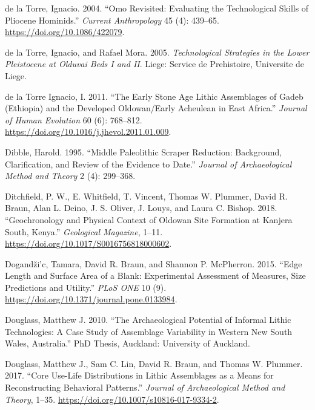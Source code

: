 \documentclass[]{elsarticle} %
\begin{document}
\leavevmode\hypertarget{ref-delatorreOmoRevisitedEvaluating2004}{}%
de la Torre, Ignacio. 2004. ``Omo Revisited: Evaluating the
Technological Skills of Pliocene Hominids.'' \emph{Current Anthropology}
45 (4): 439--65. \url{https://doi.org/10.1086/422079}.

\leavevmode\hypertarget{ref-delatorreTechnologicalStrategiesLower2005}{}%
de la Torre, Ignacio, and Rafael Mora. 2005. \emph{Technological
Strategies in the Lower Pleistocene at Olduvai Beds I and II}. Liege:
Service de Prehistoire, Universite de Liege.

\leavevmode\hypertarget{ref-delatorreignacioEarlyStoneAge2011}{}%
de la Torre Ignacio, I. 2011. ``The Early Stone Age Lithic Assemblages
of Gadeb (Ethiopia) and the Developed Oldowan/Early Acheulean in East
Africa.'' \emph{Journal of Human Evolution} 60 (6): 768--812.
\url{https://doi.org/10.1016/j.jhevol.2011.01.009}.

\leavevmode\hypertarget{ref-dibbleMiddlePaleolithicScraper1995}{}%
Dibble, Harold. 1995. ``Middle Paleolithic Scraper Reduction:
Background, Clarification, and Review of the Evidence to Date.''
\emph{Journal of Archaeological Method and Theory} 2 (4): 299--368.

\leavevmode\hypertarget{ref-ditchfieldGeochronologyPhysicalContext2018}{}%
Ditchfield, P. W., E. Whitfield, T. Vincent, Thomas W. Plummer, David R.
Braun, Alan L. Deino, J. S. Oliver, J. Louys, and Laura C. Bishop. 2018.
``Geochronology and Physical Context of Oldowan Site Formation at
Kanjera South, Kenya.'' \emph{Geological Magazine}, 1--11.
\url{https://doi.org/10.1017/S0016756818000602}.

\leavevmode\hypertarget{ref-dogandzicEdgeLengthSurface2015}{}%
Dogandži\a'c, Tamara, David R. Braun, and Shannon P. McPherron. 2015.
``Edge Length and Surface Area of a Blank: Experimental Assessment of
Measures, Size Predictions and Utility.'' \emph{PLoS ONE} 10 (9).
\url{https://doi.org/10.1371/journal.pone.0133984}.

\leavevmode\hypertarget{ref-douglassArchaeologicalPotentialInformal2010}{}%
Douglass, Matthew J. 2010. ``The Archaeological Potential of Informal
Lithic Technologies: A Case Study of Assemblage Variability in Western
New South Wales, Australia.'' PhD Thesis, Auckland: University of
Auckland.

\leavevmode\hypertarget{ref-douglassCoreUseLifeDistributions2017}{}%
Douglass, Matthew J., Sam C. Lin, David R. Braun, and Thomas W. Plummer.
2017. ``Core Use-Life Distributions in Lithic Assemblages as a Means for
Reconstructing Behavioral Patterns.'' \emph{Journal of Archaeological
Method and Theory}, 1--35.
\url{https://doi.org/10.1007/s10816-017-9334-2}.
\end{document}
